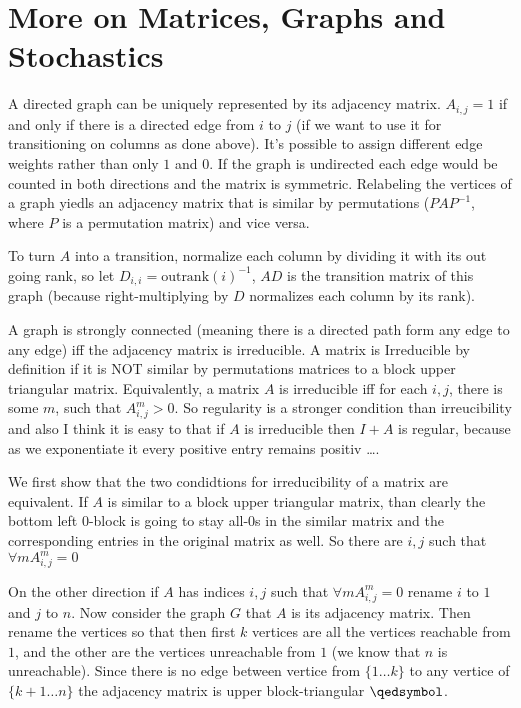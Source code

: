 \documentclass[a4paper,10pt]{article}
\newcommand{\gt}{>}
\theoremstyle{definition}
\theoremstyle{remark}
\theoremstyle{plain}
\begin{document}
\section{More on Matrices, Graphs and Stochastics}

A directed graph can be uniquely represented by its adjacency matrix.
$A_{i,j} = 1$ if and only if there is a directed edge from $i$ to $j$ (if we
want to use it for transitioning on columns as done above). It's possible to
assign different edge weights rather than only $1$ and $0$. If the graph is
undirected each edge would be counted in both directions and the matrix is
symmetric.
Relabeling the vertices of a graph yiedls an adjacency matrix that is similar by
permutations ($PAP^{-1}$, where $P$ is a permutation matrix) and vice versa.


To turn $A$ into a transition, normalize each column by dividing it with
its out going rank, so let $D_{i,i} = \text{outrank}(i)^{-1}$, $AD$ is the
transition matrix of this graph (because right-multiplying by $D$ normalizes each
column by its rank).

A graph is strongly connected (meaning there is a directed path form any edge
to any edge) iff the adjacency matrix is irreducible. A matrix is 
Irreducible by definition if it is NOT
similar by permutations matrices to a block upper triangular matrix.
Equivalently, a matrix $A$ is irreducible iff for each $i,j$, there is some $m$,
such that $A^m_{i,j} \gt 0$. So regularity is a stronger condition than
irreucibility and also I think it is easy to that if $A$ is irreducible then
$I+A$ is regular, because as we exponentiate it every positive entry remains
positiv \dots. 

We first show that the two condidtions for irreducibility of a matrix are
equivalent.
If $A$ is similar to a block  upper triangular matrix, than clearly the bottom
left $0$-block is going to stay all-$0$s in the similar matrix and the
corresponding entries in the original matrix as well. 
So there are $i,j$ such that $\forall m A^m_{i,j} = 0$ 

On the other direction if $A$ has indices $i,j$ such that $\forall m A^m_{i,j} =
0$ rename $i$ to $1$ and $j$ to $n$. Now consider the graph $G$ that $A$ is its
adjacency matrix. Then rename the vertices so that then first $k$ vertices are
all the vertices reachable from $1$, and the other are the vertices unreachable
from $1$ (we know that $n$ is unreachable). Since there is no edge between
vertice from $\{1 \dots k\}$ to any vertice of $\{k+1 \dots n\}$ the adjacency
matrix is upper block-triangular $\qedsymbol$.
\end{document}
